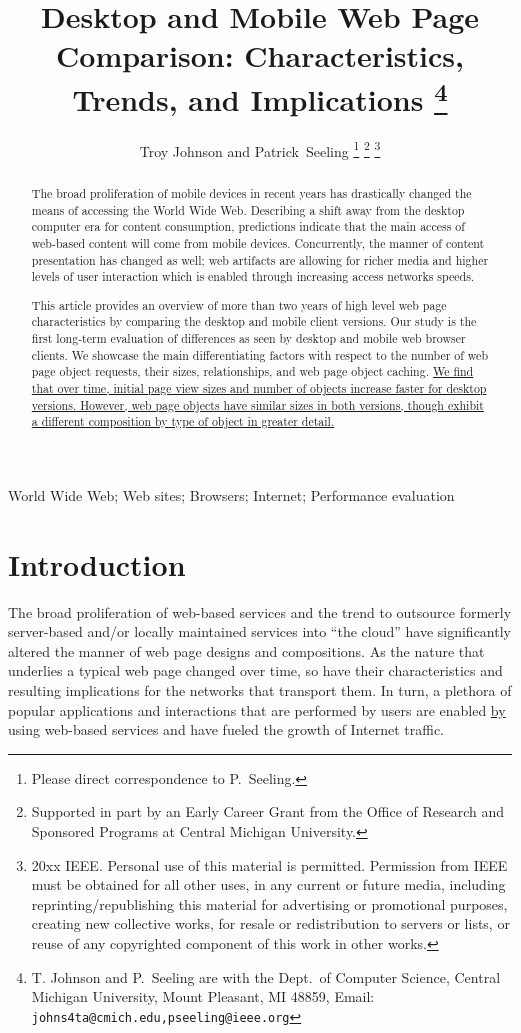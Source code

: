 \documentclass[onecolumn,12pt]{IEEEtran}
\title{Desktop and Mobile Web Page Comparison: Characteristics, Trends, and Implications
	\thanks{T. Johnson and P.~Seeling are with the Dept.~of Computer Science,
		Central Michigan University, Mount Pleasant, MI 48859, Email: \texttt{johns4ta@cmich.edu,pseeling@ieee.org}}
}
\author{Troy Johnson and Patrick~Seeling
	\thanks{Please direct correspondence to P.~Seeling.}
	\thanks{Supported in part by an Early Career Grant from the Office of Research and Sponsored Programs at Central Michigan University.}
	\thanks{\textcopyright 20xx IEEE. Personal use of this material is permitted. Permission from IEEE must be obtained for all other uses, in any current or future media, including reprinting/republishing this material for advertising or promotional purposes, creating new collective works, for resale or redistribution to servers or lists, or reuse of any copyrighted component of this work in other works.}
}
\begin{document}
\maketitle

\begin{abstract}\boldmath
The broad proliferation of mobile devices in recent years has drastically changed the means of accessing the World Wide Web.
Describing a shift away from the desktop computer era for content consumption, predictions indicate that the main access of web-based content will come from mobile devices.
Concurrently, the manner of content presentation has changed as well; web artifacts are allowing for richer media and higher levels of user interaction which is enabled through increasing access networks speeds.

This article provides an overview of more than two years of high level web page characteristics by comparing the desktop and mobile client versions.
Our study is the first long-term evaluation of differences as seen by desktop and mobile web browser clients.
We showcase the main differentiating factors with respect to the number of web page object requests, their sizes, relationships, and web page object caching. \uline{We find that over time, initial page view sizes and number of objects increase faster for desktop versions. However, web page objects have similar sizes in both versions, though exhibit a different composition by type of object in greater detail.}

\end{abstract}

\begin{IEEEkeywords}
World Wide Web; Web sites; Browsers; Internet; Performance evaluation
\end{IEEEkeywords}


\section{Introduction} 
\label{s:intro}

The broad proliferation of web-based services and the trend to outsource formerly server-based and/or locally maintained services into ``the cloud'' have significantly altered the manner of web page designs and compositions.
As the nature that underlies a typical web page changed over time, so have their characteristics and resulting implications for the networks that transport them.
In turn, a plethora of popular applications and interactions that are performed by users are enabled \uline{by} using web-based services and have fueled the growth of Internet traffic.
\end{document}
